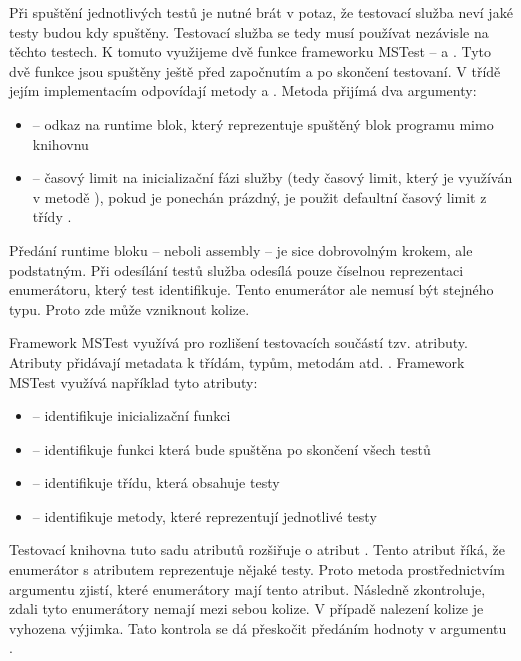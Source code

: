 Při spuštění jednotlivých testů je nutné brát v potaz, že testovací služba neví jaké testy budou kdy spuštěny. Testovací služba se tedy musí používat nezávisle na těchto testech. K tomuto využijeme dvě funkce frameworku MSTest --  a . Tyto dvě funkce jsou spuštěny ještě před započnutím a po skončení testovaní. V třídě  jejím implementacím odpovídají metody  a . Metoda  přijímá dva argumenty:

\begin{itemize}
    \item {} -- odkaz na runtime blok, který reprezentuje spuštěný blok programu mimo knihovnu
    \item {} -- časový limit na inicializační fázi služby (tedy časový limit, který je využíván v metodě ), pokud je ponechán prázdný, je použit defaultní časový limit z třídy .
\end{itemize}

Předání runtime bloku -- neboli assembly -- je sice dobrovolným krokem, ale podstatným. Při odesílání testů služba odesílá pouze číselnou reprezentaci enumerátoru, který test identifikuje. Tento enumerátor ale nemusí být stejného typu. Proto zde může vzniknout kolize.

Framework MSTest využívá pro rozlišení testovacích součástí tzv. atributy. Atributy přidávají metadata k třídám, typům, metodám atd. \cite{attribute_docs}. Framework MSTest využívá například tyto atributy:

\begin{itemize}
    \item {} -- identifikuje inicializační funkci
    \item {} -- identifikuje funkci která bude spuštěna po skončení všech testů
    \item {} -- identifikuje třídu, která obsahuje testy
    \item {} -- identifikuje metody, které reprezentují jednotlivé testy
\end{itemize}

Testovací knihovna tuto sadu atributů rozšiřuje o atribut . Tento atribut říká, že enumerátor s atributem  reprezentuje nějaké testy. Proto metoda  prostřednictvím argumentu  zjistí, které enumerátory mají tento atribut. Následně zkontroluje, zdali tyto enumerátory nemají mezi sebou kolize. V případě nalezení kolize je vyhozena výjimka. Tato kontrola se dá přeskočit předáním hodnoty  v argumentu .

